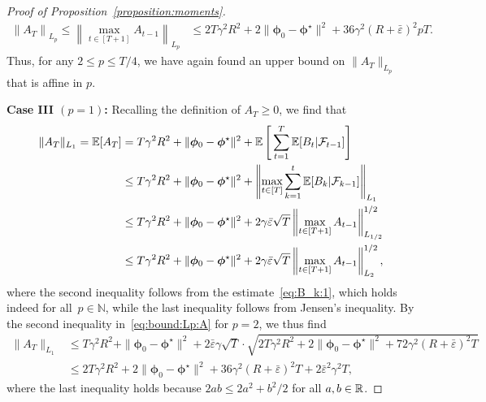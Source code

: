 \documentclass[11pt, a4paper, oneside, reqno]{article}
\begin{document}
\begin{proof}[Proof of Proposition~\ref{proposition:moments}]
		\begin{align}
		\label{eq:bound:Lp:A}
		\left\| A_{T} \right\|_{L_p}
		\leq \left\| \max_{t \in [T+1]} A_{t-1} \right\|_{L_p} 
		&\leq 2 T \gamma^2 R^2 + 2 \| \bm \phi_0 - \bm \phi^\star \|^2 + 36 \gamma^2 \left( R + \bar \varepsilon \right)^2 p T.
		\end{align}
		Thus, for any $2 \leq p \leq T/4$, we have again found an upper bound on $\| A_{T}\|_{L_p}$ that is affine in $p$.
		
		\textbf{Case III $({p = 1})$:} Recalling the definition of $A_T\ge 0$, we find that
		\begin{align*}
		    \| A_T \|_{L_{1}} = \mathbb{E} [A_T] 
		    &= T \gamma^2 R^2 + \| \bm \phi_0 - \bm \phi^\star \|^2 + \mathbb{E} \left[ \, \sum_{t=1}^T \mathbb{E} [B_t | \mathcal F_{t-1}] \right] \\
		    &\leq T \gamma^2 R^2 + \| \bm \phi_0 - \bm \phi^\star \|^2 + \left\| \max_{t \in [T]} \sum_{k=1}^t \mathbb{E}[B_k | \mathcal F_{k-1}] \right\|_{L_1} \\
		    &\leq T \gamma^2 R^2 + \| \bm \phi_0 - \bm \phi^\star \|^2 + 2 \gamma \bar \varepsilon \sqrt{T} \left\| \max_{t \in [T+1]} A_{t-1} \right\|^{1/2}_{L_{1/2}} \\
		    &\leq T \gamma^2 R^2 + \| \bm \phi_0 - \bm \phi^\star \|^2 + 2 \gamma \bar \varepsilon \sqrt{T} \left\| \max_{t \in [T+1]} A_{t-1} \right\|^{1/2}_{L_{2}},
		\end{align*}
		where the second inequality follows from the estimate~\eqref{eq:B_k:1}, which holds indeed for all~$p\in\mathbb N$, while the last inequality follows from Jensen's inequality. By the second inequality in~\eqref{eq:bound:Lp:A} for $p=2$, we thus find
		\begin{subequations}
		\label{eq:bound:E:A}
		\begin{align}
		    \label{eq:bound:E:A1}
		    \| A_T \|_{L_{1}} %
		    &\leq T \gamma^2 R^2 + \| \bm \phi_0 - \bm \phi^\star \|^2 + 2 \bar \varepsilon \gamma \sqrt{T} \cdot \sqrt{2 T \gamma^2 R^2 + 2 \| \bm \phi_0 - \bm \phi^\star \|^2 + 72 \gamma^2 (R + \bar \varepsilon)^2 T} \\
		    &\leq 2 T \gamma^2 R^2 + 2 \| \bm \phi_0 - \bm \phi^\star \|^2 + 36 \gamma^2 (R + \bar \varepsilon)^2 T + 2 \bar \varepsilon^2 \gamma^2 T ,
		    \label{eq:bound:E:A2}
		\end{align}
		\end{subequations}
		where the last inequality holds because $2ab \leq 2a^2 + b^2/ 2$ for all $a,b\in\mathbb{R}$.
		

\end{proof}
\end{document}
